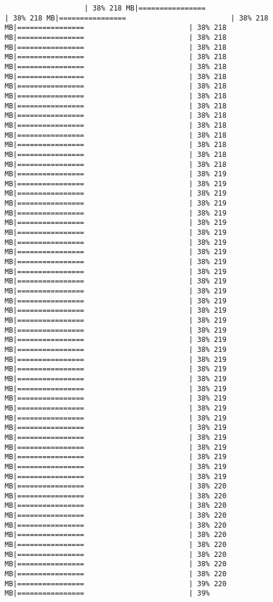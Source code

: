 \documentclass[
]{article}
\begin{document}
\begin{verbatim}
                   | 38% 218 MB|================                         | 38% 218 MB|================                         | 38% 218 MB|================                         | 38% 218 MB|================                         | 38% 218 MB|================                         | 38% 218 MB|================                         | 38% 218 MB|================                         | 38% 218 MB|================                         | 38% 218 MB|================                         | 38% 218 MB|================                         | 38% 218 MB|================                         | 38% 218 MB|================                         | 38% 218 MB|================                         | 38% 218 MB|================                         | 38% 218 MB|================                         | 38% 218 MB|================                         | 38% 218 MB|================                         | 38% 218 MB|================                         | 38% 219 MB|================                         | 38% 219 MB|================                         | 38% 219 MB|================                         | 38% 219 MB|================                         | 38% 219 MB|================                         | 38% 219 MB|================                         | 38% 219 MB|================                         | 38% 219 MB|================                         | 38% 219 MB|================                         | 38% 219 MB|================                         | 38% 219 MB|================                         | 38% 219 MB|================                         | 38% 219 MB|================                         | 38% 219 MB|================                         | 38% 219 MB|================                         | 38% 219 MB|================                         | 38% 219 MB|================                         | 38% 219 MB|================                         | 38% 219 MB|================                         | 38% 219 MB|================                         | 38% 219 MB|================                         | 38% 219 MB|================                         | 38% 219 MB|================                         | 38% 219 MB|================                         | 38% 219 MB|================                         | 38% 219 MB|================                         | 38% 219 MB|================                         | 38% 219 MB|================                         | 38% 219 MB|================                         | 38% 219 MB|================                         | 38% 219 MB|================                         | 38% 219 MB|================                         | 38% 220 MB|================                         | 38% 220 MB|================                         | 38% 220 MB|================                         | 38% 220 MB|================                         | 38% 220 MB|================                         | 38% 220 MB|================                         | 38% 220 MB|================                         | 38% 220 MB|================                         | 38% 220 MB|================                         | 38% 220 MB|================                         | 39% 220 MB|================                         | 39% 
\end{verbatim}
\end{document}
